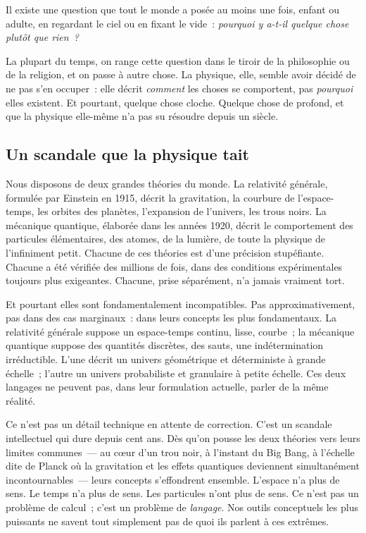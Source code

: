 \documentclass[12pt, a4paper, openright]{book}
\begin{document}
Il existe une question que tout le monde a posée au moins une fois, enfant ou adulte, en regardant le ciel ou en fixant le vide~: \emph{pourquoi y a-t-il quelque chose plutôt que rien~?}

\medskip

La plupart du temps, on range cette question dans le tiroir de la philosophie ou de la religion, et on passe à autre chose. La physique, elle, semble avoir décidé de ne pas s'en occuper~: elle décrit \emph{comment} les choses se comportent, pas \emph{pourquoi} elles existent. Et pourtant, quelque chose cloche. Quelque chose de profond, et que la physique elle-même n'a pas su résoudre depuis un siècle.

\subsection*{Un scandale que la physique tait}

Nous disposons de deux grandes théories du monde. La relativité générale, formulée par Einstein en 1915, décrit la gravitation, la courbure de l'espace-temps, les orbites des planètes, l'expansion de l'univers, les trous noirs. La mécanique quantique, élaborée dans les années 1920, décrit le comportement des particules élémentaires, des atomes, de la lumière, de toute la physique de l'infiniment petit. Chacune de ces théories est d'une précision stupéfiante. Chacune a été vérifiée des millions de fois, dans des conditions expérimentales toujours plus exigeantes. Chacune, prise séparément, n'a jamais vraiment tort.

\medskip

Et pourtant elles sont fondamentalement incompatibles. Pas approximativement, pas dans des cas marginaux~: dans leurs concepts les plus fondamentaux. La relativité générale suppose un espace-temps continu, lisse, courbe~; la mécanique quantique suppose des quantités discrètes, des sauts, une indétermination irréductible. L'une décrit un univers géométrique et déterministe à grande échelle~; l'autre un univers probabiliste et granulaire à petite échelle. Ces deux langages ne peuvent pas, dans leur formulation actuelle, parler de la même réalité.

\medskip

Ce n'est pas un détail technique en attente de correction. C'est un scandale intellectuel qui dure depuis cent ans. Dès qu'on pousse les deux théories vers leurs limites communes~--- au c\oe{}ur d'un trou noir, à l'instant du Big Bang, à l'échelle dite de Planck où la gravitation et les effets quantiques deviennent simultanément incontournables~--- leurs concepts s'effondrent ensemble. L'espace n'a plus de sens. Le temps n'a plus de sens. Les particules n'ont plus de sens. Ce n'est pas un problème de calcul~; c'est un problème de \emph{langage}. Nos outils conceptuels les plus puissants ne savent tout simplement pas de quoi ils parlent à ces extrêmes.
\end{document}
